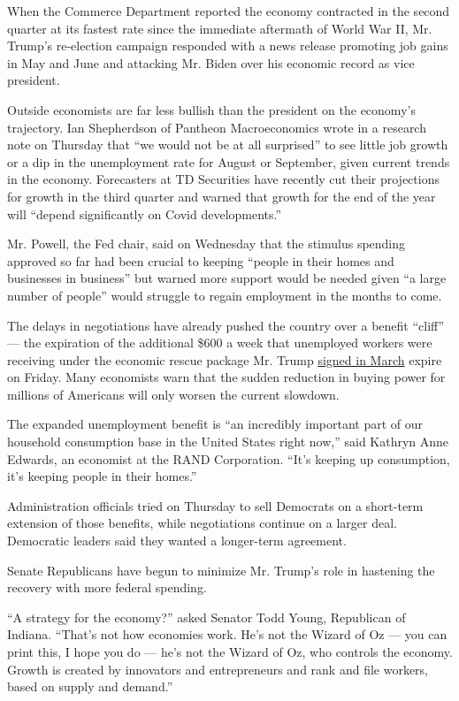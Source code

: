 When the Commerce Department reported the economy contracted in the
second quarter at its fastest rate since the immediate aftermath of
World War II, Mr. Trump's re-election campaign responded with a news
release promoting job gains in May and June and attacking Mr. Biden over
his economic record as vice president.

Outside economists are far less bullish than the president on the
economy's trajectory. Ian Shepherdson of Pantheon Macroeconomics wrote
in a research note on Thursday that ``we would not be at all surprised''
to see little job growth or a dip in the unemployment rate for August or
September, given current trends in the economy. Forecasters at TD
Securities have recently cut their projections for growth in the third
quarter and warned that growth for the end of the year will ``depend
significantly on Covid developments.''

Mr. Powell, the Fed chair, said on Wednesday that the stimulus spending
approved so far had been crucial to keeping ``people in their homes and
businesses in business'' but warned more support would be needed given
``a large number of people'' would struggle to regain employment in the
months to come.

The delays in negotiations have already pushed the country over a
benefit ``cliff'' --- the expiration of the additional \$600 a week that
unemployed workers were receiving under the economic rescue package Mr.
Trump
\href{https://www.nytimes3xbfgragh.onion/2020/03/25/us/politics/coronavirus-senate-deal.html}{signed
in March} expire on Friday. Many economists warn that the sudden
reduction in buying power for millions of Americans will only worsen the
current slowdown.

The expanded unemployment benefit is ``an incredibly important part of
our household consumption base in the United States right now,'' said
Kathryn Anne Edwards, an economist at the RAND Corporation. ``It's
keeping up consumption, it's keeping people in their homes.''

Administration officials tried on Thursday to sell Democrats on a
short-term extension of those benefits, while negotiations continue on a
larger deal. Democratic leaders said they wanted a longer-term
agreement.

Senate Republicans have begun to minimize Mr. Trump's role in hastening
the recovery with more federal spending.

``A strategy for the economy?'' asked Senator Todd Young, Republican of
Indiana. ``That's not how economies work. He's not the Wizard of Oz ---
you can print this, I hope you do --- he's not the Wizard of Oz, who
controls the economy. Growth is created by innovators and entrepreneurs
and rank and file workers, based on supply and demand.''

